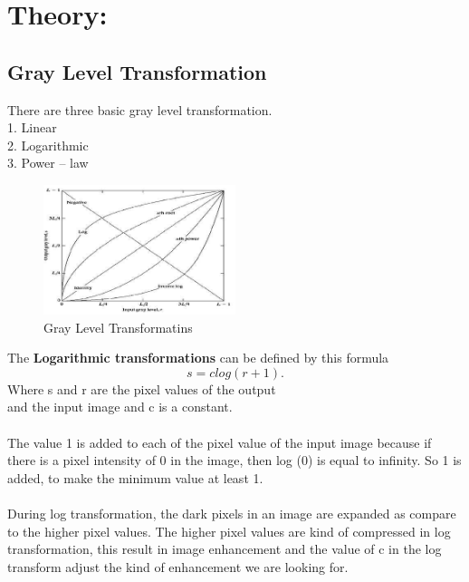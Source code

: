 \documentclass[12pt]{article}
\begin{document}

\tableofcontents
\pagebreak


\section{Theory:}
\subsection{Gray Level Transformation}
There are three basic gray level transformation.\\
1. Linear\\
2. Logarithmic\\
3. Power – law\\
\begin{figure}[h]
\includegraphics[width=0.5\textwidth, inner ]{graylevelexample.jpg}
\caption{Gray Level Transformatins}
\label{fig:figure1}
\end{figure}

The \textbf{Logarithmic transformations} can be defined by this formula
	$$ s = c  log(r + 1).$$
Where s and r are the pixel values of the output\\ 
and the input image and c is a constant.\\\\
The value 1 is added to each of the pixel value of the input image because if there is a pixel intensity of 0 in the image, then log (0) is equal to infinity. So 1 is added, to make the minimum value at least 1.\\\\
During log transformation, the dark pixels in an image are expanded as compare to the higher pixel values. The higher pixel values are kind of compressed in log transformation, this result in image enhancement and the value of c in the log transform adjust the kind of enhancement we are looking for.\\
\end{document}
